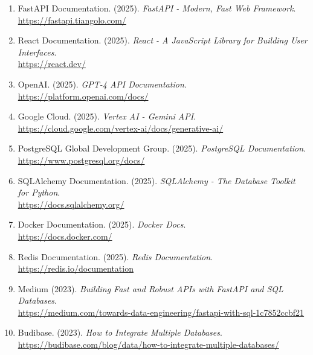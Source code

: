 \documentclass[a4paper, 12pt]{article}
\begin{document}
\begin{enumerate}
    \item FastAPI Documentation. (2025). \textit{FastAPI - Modern, Fast Web Framework}. \\
    \url{https://fastapi.tiangolo.com/}
    
    \item React Documentation. (2025). \textit{React - A JavaScript Library for Building User Interfaces}. \\
    \url{https://react.dev/}
    
    \item OpenAI. (2025). \textit{GPT-4 API Documentation}. \\
    \url{https://platform.openai.com/docs/}
    
    \item Google Cloud. (2025). \textit{Vertex AI - Gemini API}. \\
    \url{https://cloud.google.com/vertex-ai/docs/generative-ai/}
    
    \item PostgreSQL Global Development Group. (2025). \textit{PostgreSQL Documentation}. \\
    \url{https://www.postgresql.org/docs/}
    
    \item SQLAlchemy Documentation. (2025). \textit{SQLAlchemy - The Database Toolkit for Python}. \\
    \url{https://docs.sqlalchemy.org/}
    
    \item Docker Documentation. (2025). \textit{Docker Docs}. \\
    \url{https://docs.docker.com/}
    
    \item Redis Documentation. (2025). \textit{Redis Documentation}. \\
    \url{https://redis.io/documentation}

    \item Medium (2023). \textit{Building Fast and Robust APIs with FastAPI and SQL Databases}. \\
    \url{https://medium.com/towards-data-engineering/fastapi-with-sql-1c7852ccbf21}
    
    \item Budibase. (2023). \textit{How to Integrate Multiple Databases}. \\
    \url{https://budibase.com/blog/data/how-to-integrate-multiple-databases/}
    

\end{enumerate}
\end{document}
